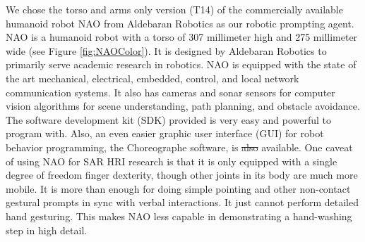 \documentclass{ut-thesis}
\providecommand{\DIFdeltex}[1]{{\protect\color{red}\sout{#1}}}                      %
\providecommand{\DIFdelbegin}{} %
\providecommand{\DIFdelend}{} %
\providecommand{\DIFdel}[1]{\texorpdfstring{\DIFdeltex{#1}}{}} %
\begin{document}
We chose the torso and arms only version (T14) of the commercially available humanoid robot NAO from Aldebaran Robotics as our robotic prompting agent.  NAO is a humanoid robot with a torso of 307 millimeter high and 275 millimeter wide (see Figure \ref{fig:NAOColor}).  It is designed by Aldebaran Robotics to primarily serve academic research in robotics.  NAO is equipped with the state of the art mechanical, electrical, embedded, control, and local network communication systems.  It also has cameras and sonar sensors for computer vision algorithms for scene understanding, path planning, and obstacle avoidance.  The software development kit (SDK) provided is very easy and powerful to program with.  Also, an even easier graphic user interface (GUI) for robot behavior programming, the Choreographe software, is \DIFdelbegin \DIFdel{also }\DIFdelend available.  One caveat of using NAO for SAR HRI research is that it is only equipped with a single degree of freedom finger dexterity, though other joints in its body are much more mobile.  It is more than enough for doing simple pointing and other non-contact gestural prompts in sync with verbal interactions.  It just cannot perform detailed hand gesturing.  This makes NAO less capable in demonstrating a hand-washing step in high detail.
\end{document}
